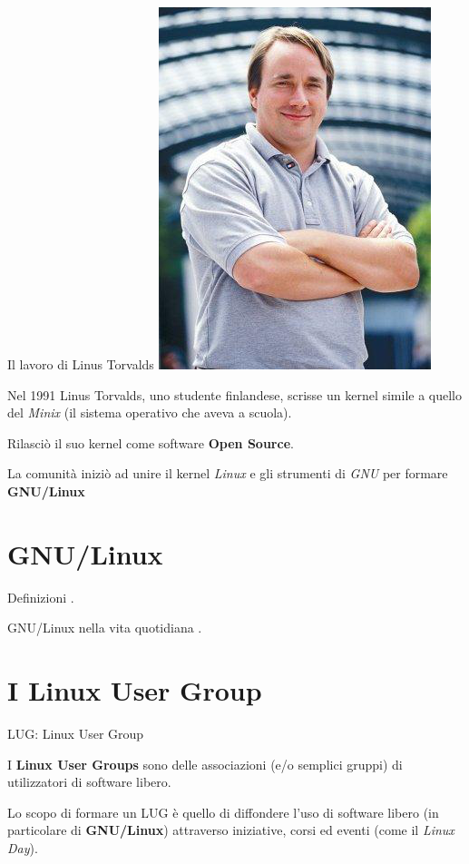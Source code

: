 \documentclass[10pt]{beamer}
\begin{document}
\begin{frame}[fragile]{Il lavoro di Linus Torvalds}
\includegraphics[scale=0.3]{linus}

Nel 1991 Linus Torvalds, uno studente finlandese, scrisse un kernel simile a quello del \textit{Minix} (il sistema operativo che aveva a scuola).

Rilasciò il suo kernel come software \textbf{Open Source}.

La comunità iniziò ad unire il kernel \textit{Linux} e gli strumenti di \textit{GNU} per formare \textbf{GNU/Linux}

\end{frame}

\section{GNU/Linux}

\begin{frame}[fragile]{Definizioni}
.
\end{frame}

\begin{frame}[fragile]{GNU/Linux nella vita quotidiana}
.
\end{frame}

\section{I Linux User Group}

\begin{frame}{LUG: Linux User Group}

I \textbf{Linux User Groups} sono delle associazioni (e/o semplici gruppi) di utilizzatori di software libero.

Lo scopo di formare un LUG è quello di diffondere l'uso di software libero (in particolare di \textbf{GNU/Linux}) attraverso iniziative, corsi ed eventi (come il \textit{Linux Day}).

\end{frame}
\end{document}
